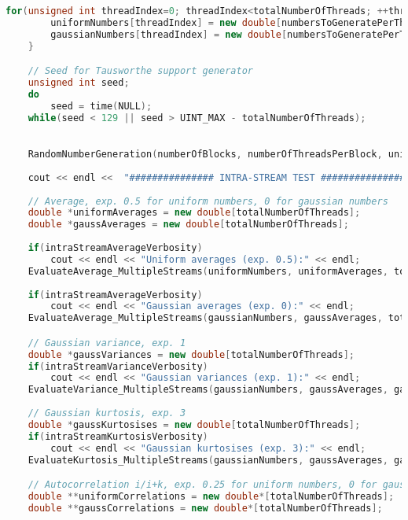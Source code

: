 \begin{lstlisting}[language=C++, caption={\texttt{libraries/CoreLibraries/RandomGenerator/CorrelationTest.cu}}]
	for(unsigned int threadIndex=0; threadIndex<totalNumberOfThreads; ++threadIndex){
		uniformNumbers[threadIndex] = new double[numbersToGeneratePerThread];
		gaussianNumbers[threadIndex] = new double[numbersToGeneratePerThread];
	}

	// Seed for Tausworthe support generator
	unsigned int seed;	
	do
		seed = time(NULL);
	while(seed < 129 || seed > UINT_MAX - totalNumberOfThreads);
	

	RandomNumberGeneration(numberOfBlocks, numberOfThreadsPerBlock, uniformNumbers, gaussianNumbers, totalNumbersToGenerate, numbersToGeneratePerThread, seed);
	
	cout << endl <<  "############### INTRA-STREAM TEST ###############" << endl;
	
	// Average, exp. 0.5 for uniform numbers, 0 for gaussian numbers
	double *uniformAverages = new double[totalNumberOfThreads];
	double *gaussAverages = new double[totalNumberOfThreads];
	
	if(intraStreamAverageVerbosity)
		cout << endl << "Uniform averages (exp. 0.5):" << endl;
	EvaluateAverage_MultipleStreams(uniformNumbers, uniformAverages, totalNumberOfThreads, numbersToGeneratePerThread, intraStreamAverageVerbosity);
	
	if(intraStreamAverageVerbosity)
		cout << endl << "Gaussian averages (exp. 0):" << endl;
	EvaluateAverage_MultipleStreams(gaussianNumbers, gaussAverages, totalNumberOfThreads, numbersToGeneratePerThread, intraStreamAverageVerbosity);

	// Gaussian variance, exp. 1
	double *gaussVariances = new double[totalNumberOfThreads];
	if(intraStreamVarianceVerbosity)
		cout << endl << "Gaussian variances (exp. 1):" << endl;
	EvaluateVariance_MultipleStreams(gaussianNumbers, gaussAverages, gaussVariances, totalNumberOfThreads, numbersToGeneratePerThread, intraStreamVarianceVerbosity);
	
	// Gaussian kurtosis, exp. 3
	double *gaussKurtosises = new double[totalNumberOfThreads];
	if(intraStreamKurtosisVerbosity)
		cout << endl << "Gaussian kurtosises (exp. 3):" << endl;
	EvaluateKurtosis_MultipleStreams(gaussianNumbers, gaussAverages, gaussVariances, gaussKurtosises, totalNumberOfThreads, numbersToGeneratePerThread, intraStreamKurtosisVerbosity);

	// Autocorrelation i/i+k, exp. 0.25 for uniform numbers, 0 for gaussian numbers
	double **uniformCorrelations = new double*[totalNumberOfThreads];
	double **gaussCorrelations = new double*[totalNumberOfThreads];
	

\end{lstlisting}
